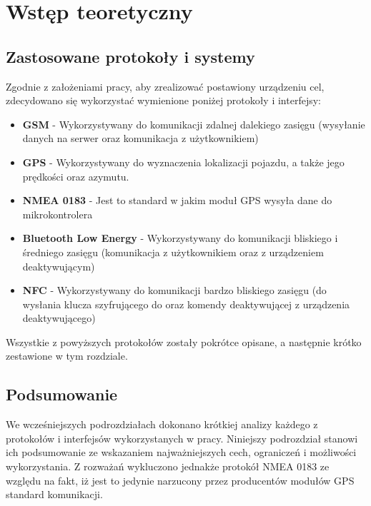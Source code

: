 \chapter{Wstęp teoretyczny}
\label{teorethical_introduction}

\section{Zastosowane protokoły i systemy}
Zgodnie z założeniami pracy, aby zrealizować postawiony urządzeniu cel, zdecydowano się wykorzystać wymienione poniżej protokoły i interfejsy:
\begin{itemize}
	\item \textbf{GSM} - Wykorzystywany do komunikacji zdalnej dalekiego zasięgu (wysyłanie danych na serwer oraz komunikacja z użytkownikiem)
	\item \textbf{GPS} - Wykorzystywany do wyznaczenia lokalizacji pojazdu, a także jego prędkości oraz azymutu.
	
	\item \textbf{NMEA 0183} - Jest to standard w jakim moduł GPS wysyła dane do mikrokontrolera
	\item \textbf{Bluetooth Low Energy} - Wykorzystywany do komunikacji bliskiego i średniego zasięgu (komunikacja z użytkownikiem oraz z urządzeniem deaktywującym)
	\item \textbf{NFC} - Wykorzystywany do komunikacji bardzo bliskiego zasięgu (do wysłania klucza szyfrującego do oraz komendy deaktywującej z urządzenia deaktywującego)
\end{itemize}

Wszystkie z powyższych protokołów zostały pokrótce opisane, a następnie krótko zestawione w tym rozdziale.

\clearpage











\clearpage
\section{Podsumowanie}

We wcześniejszych podrozdziałach dokonano krótkiej analizy każdego z protokołów i interfejsów wykorzystanych w pracy. Niniejszy podrozdział stanowi ich podsumowanie ze wskazaniem najważniejszych cech, ograniczeń i możliwości wykorzystania. Z rozważań wykluczono jednakże protokół NMEA 0183 ze względu na fakt, iż jest to jedynie narzucony przez producentów modułów GPS standard komunikacji.

